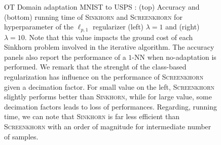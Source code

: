 \begin{figure}[htbp]
	\caption{OT Domain adaptation MNIST to USPS : (top) Accuracy and (bottom) running time of \textsc{Sinkhorn} and \textsc{Screenkhorn} for hyperparameter of the $\ell_{p,1}$ regularizer (left) $\lambda = 1$ and (right) $\lambda=10$. Note that this
	value impacts the ground cost of each Sinkhorn problem involved in the iterative algorithm. The accuracy panels
	also report the performance of a $1$-NN when no-adaptation is performed.  
	We remark that the strenght of the class-based regularization has influence on the performance of \textsc{Screenkhorn} given a decimation factor. For small value on the left, \textsc{Screenkhorn} slightly performs better than \textsc{Sinkhorn}, while for large value, some
	decimation factors leads to loss of performances.
	Regarding, running time, we can note that \textsc{Sinkhorn} is far less efficient than
	\textsc{Screenkhorn}  with an order of magnitude for intermediate number of samples.
	\label{fig:otda:mnist:extra}}
\end{figure}
